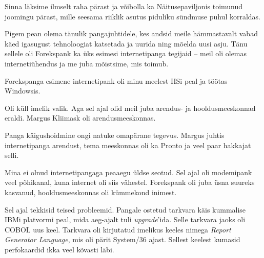 Sinna läksime ilmselt raha pärast ja võibolla ka 
Näitusepaviljonis toimunud joomingu pärast, mille seesama riiklik asutus piduliku sündmuse puhul 
korraldas.


Pigem pean olema tänulik pangajuhtidele, kes andsid meile 
hämmastavalt vabad käed igasugust tehnoloogiat katsetada ja uurida ning mõelda 
uusi asju. Tänu sellele oli Forekspank ka üks esimesi internetipanga tegijaid -- meil oli olemas internetiühendus ja me juba mõistsime, mis toimub. 


Forekspanga esimene internetipank oli minu meelest 
IISi peal ja töötas
Windowsis. 


Oli küll imelik valik. Aga sel ajal olid meil juba arendus- ja 
hooldusmeeskonnad eraldi. Margus Kliimask oli 
arendusmeeskonnas. 


Panga käigushoidmine ongi natuke omapärane tegevus. Margus 
 juhtis internetipanga arendust, tema meeskonnas
oli ka Pronto ja veel paar 
hakkajat selli. 


Mina ei olnud internetipangaga peaaegu üldse seotud. Sel ajal oli
modemipank veel põhikanal, kuna internet oli siis vähestel. Forekspank oli juba üsna suureks kasvanud, 
hooldusmeeskonnas oli kümmekond inimest.


Sel ajal tekkisid teised probleemid. 
Pangale ostetud tarkvara käis kummalise IBMi platvormi peal, mida aeg-ajalt 
tuli \emph{upgrade}'ida. Selle tarkvara jaoks oli COBOL uus keel. 
Tarkvara oli kirjutatud imelikus keeles nimega \emph{Report Generator Language}, mis 
oli pärit System/36 ajast. Sellest keelest 
kumasid perfokaardid ikka veel kõvasti läbi.


